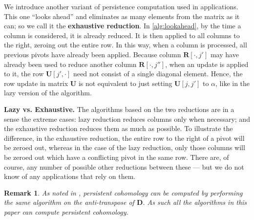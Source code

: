 \documentclass{article}
\newtheorem{remark}[theorem]{Remark}
\newcommand{\mat}[1]{\mathbf{#1}}
\renewcommand{\paragraph}[1]{\noindent\textbf{#1.}}
\begin{document}
We introduce another variant of persistence computation used in applications.  This one ``looks ahead'' and eliminates as many elements from the matrix as it can; so we call it the \textbf{exhaustive reduction}.
In \cref{alg:lookahead}, by the time a column is considered, it is already reduced.
It is then applied to all columns to the right, zeroing out the entire row.
In this way,
when a column is processed, all previous pivots have already been applied.
%
Because column $\mat{R}[\cdot,j']$ may have already been used to reduce another column
$\mat{R}[\cdot,j'']$, when an update is applied to it, the row $\mat{U}[j',\cdot]$
need not consist of a single diagonal element. Hence, the row update in matrix $\mat{U}$ is not
equivalent to just setting $\mat{U}[j,j']$ to $\alpha$, like in the lazy version
of the algorithm.

\vspace{0.1cm}
\paragraph{\textbf{Lazy vs. Exhaustive}}
%
The algorithms based on the two reductions are in a sense the extreme cases: lazy reduction reduces columns only when necessary; and the exhaustive reduction reduces them as much as possible. To illustrate the difference, in the exhaustive reduction, the entire row to the right of a pivot will be zeroed out, whereas in the case of the lazy reduction, only those columns will be zeroed out which have a conflicting pivot in the same row. There are, of course, any number of possible other reductions between these --- but we do not know of any applications that rely on them.


\begin{remark}
As noted in \cite[Section 3.4]{de2011dualities}, persistent cohomology can be computed by performing the same algorithm on the anti-transpose of $\mat{D}$. As such all the algorithms in this paper can compute persistent cohomology.%
 \end{remark}
\end{document}
